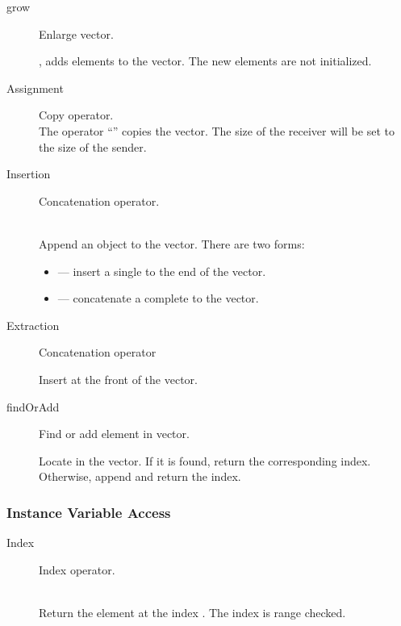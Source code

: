\begin{description}
\item[grow] \texonly{---} Enlarge vector.\\

, adds  elements to the vector.  The new
elements are not initialized.

\item[Assignment] \texonly{---} Copy operator.\\
The operator ``\code{=}'' copies the vector.  The size of the receiver
will be set to the size of the sender.  

\item[Insertion] \texonly{---} Concatenation operator.\\
\\

Append an object to the vector.  There are two forms:
\begin{itemize}
\item {}  --- insert a single
   to the end of the vector.
\item {}  --- concatenate a
  complete  to the vector.
\end{itemize}

\item[Extraction] \texonly{---} Concatenation operator\\

Insert  at the front of the vector.  

\item[findOrAdd] \texonly{---} Find or add element in vector.\\

Locate  in the vector.  If it is found, return the
corresponding index.  Otherwise, append  and return the
index. 
\end{description}

\subsubsection{Instance Variable Access}
\label{sec:vector-ivar}

\begin{description}

\item[Index] \texonly{---} Index operator.\\
\\

Return the element at the index .  The index is range checked.
\end{description}

